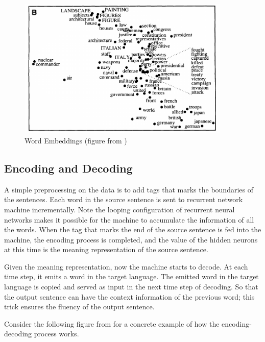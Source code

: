 \documentclass[final]{ua-thesis}
\numberwithin{equation}{section}
\begin{document}
\begin{figure}
\caption{Word Embeddings (figure from \citet{roweis2000nonlinear})}
\centering
\includegraphics[width=0.9\textwidth]{word_emb.png}
\end{figure} 


\subsection{Encoding and Decoding}

A simple preprocessing on the data is to add tags that marks the boundaries of the sentences. Each word in the source sentence is sent to recurrent network machine incrementally. 
Note the looping configuration of recurrent neural networks makes it possible for the machine to accumulate the information of all the words. When the tag that marks the end of the source sentence is fed into the machine, the encoding process is completed, and the value of the hidden neurons at this time is the meaning representation of the source sentence.  

Given the meaning representation, now the machine starts to decode. At each time step, it emits a word in the target language. The emitted word in the target language is copied and served as input in the next time step of decoding. So that the output sentence can have the context information of the previous word; this trick ensures the fluency of the output sentence. 

Consider the following figure from \citet{luong17GitHub} for a concrete example of how the encoding-decoding process works.  
\end{document}
